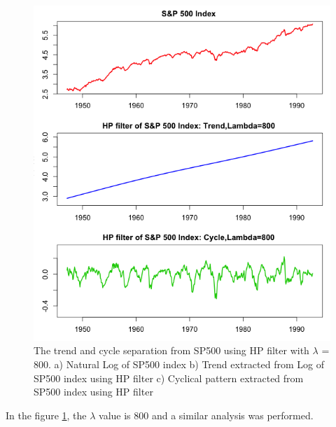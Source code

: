 \begin{figure}[!ht]
\centering
\includegraphics[scale=.65]{Images/SP500HP800}
\caption{The trend and cycle separation from SP500 using HP filter with $\lambda$ = 800. a) Natural Log of SP500 index b) Trend extracted from Log of SP500 index using HP filter c) Cyclical pattern extracted from SP500 index using HP filter }
\label{fig:SP500HP800}
\end{figure}
In the figure \ref{fig:SP500HP800}, the $\lambda$ value is 800  and a similar analysis was performed.


